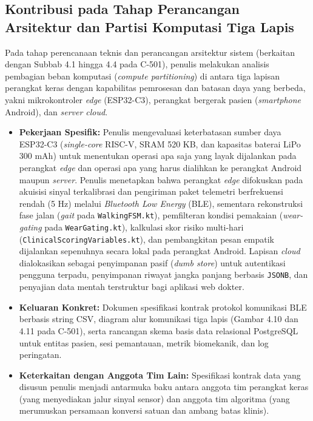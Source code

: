 \subsection{Kontribusi pada Tahap Perancangan Arsitektur dan Partisi Komputasi Tiga Lapis}
\label{subsec:kontribusi_tahap1}

Pada tahap perencanaan teknis dan perancangan arsitektur sistem (berkaitan dengan Subbab 4.1 hingga 4.4 pada C-501), penulis melakukan analisis pembagian beban komputasi (\textit{compute partitioning}) di antara tiga lapisan perangkat keras dengan kapabilitas pemrosesan dan batasan daya yang berbeda, yakni mikrokontroler \textit{edge} (ESP32-C3), perangkat bergerak pasien (\textit{smartphone} Android), dan \textit{server cloud}.

\begin{itemize}
    \item \textbf{Pekerjaan Spesifik:} Penulis mengevaluasi keterbatasan sumber daya ESP32-C3 (\textit{single-core} RISC-V, SRAM 520 KB, dan kapasitas baterai LiPo 300 mAh) untuk menentukan operasi apa saja yang layak dijalankan pada perangkat \textit{edge} dan operasi apa yang harus dialihkan ke perangkat Android maupun \textit{server}. Penulis menetapkan bahwa perangkat \textit{edge} difokuskan pada akuisisi sinyal terkalibrasi dan pengiriman paket telemetri berfrekuensi rendah (5 Hz) melalui \textit{Bluetooth Low Energy} (BLE), sementara rekonstruksi fase jalan (\textit{gait} pada \texttt{WalkingFSM.kt}), pemfilteran kondisi pemakaian (\textit{wear-gating} pada \texttt{WearGating.kt}), kalkulasi skor risiko multi-hari (\texttt{ClinicalScoringVariables.kt}), dan pembangkitan pesan empatik dijalankan sepenuhnya secara lokal pada perangkat Android. Lapisan \textit{cloud} dialokasikan sebagai penyimpanan pasif (\textit{dumb store}) untuk autentikasi pengguna terpadu, penyimpanan riwayat jangka panjang berbasis \texttt{JSONB}, dan penyajian data mentah terstruktur bagi aplikasi web dokter.
    \item \textbf{Keluaran Konkret:} Dokumen spesifikasi kontrak protokol komunikasi BLE berbasis string CSV, diagram alur komunikasi tiga lapis (Gambar 4.10 dan 4.11 pada C-501), serta rancangan skema basis data relasional PostgreSQL untuk entitas pasien, sesi pemantauan, metrik biomekanik, dan log peringatan.
    \item \textbf{Keterkaitan dengan Anggota Tim Lain:} Spesifikasi kontrak data yang disusun penulis menjadi antarmuka baku antara anggota tim perangkat keras (yang menyediakan jalur sinyal sensor) dan anggota tim algoritma (yang merumuskan persamaan konversi satuan dan ambang batas klinis).
\end{itemize}

